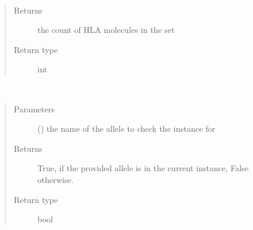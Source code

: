 \documentclass[letterpaper,10pt,english]{sphinxmanual}
\begin{document}
\begin{fulllineitems}
\begin{fulllineitems}
\end{fulllineitems}


\begin{fulllineitems}
\label{\detokenize{IPTK.Classes:IPTK.Classes.HLASet.HLASet.get_hla_count}}~\begin{quote}\begin{description}
\item[{Returns}] \leavevmode
the count of HLA molecules in the set

\item[{Return type}] \leavevmode
int

\end{description}\end{quote}

\end{fulllineitems}


\begin{fulllineitems}
\label{\detokenize{IPTK.Classes:IPTK.Classes.HLASet.HLASet.has_allele}}~\begin{quote}\begin{description}
\item[{Parameters}] \leavevmode
{} () \textendash{} the name of the allele to check the instance for

\item[{Returns}] \leavevmode
True, if the provided allele is in the current instance, False otherwise.

\item[{Return type}] \leavevmode
bool

\end{description}\end{quote}

\end{fulllineitems}



\end{fulllineitems}
\end{document}
